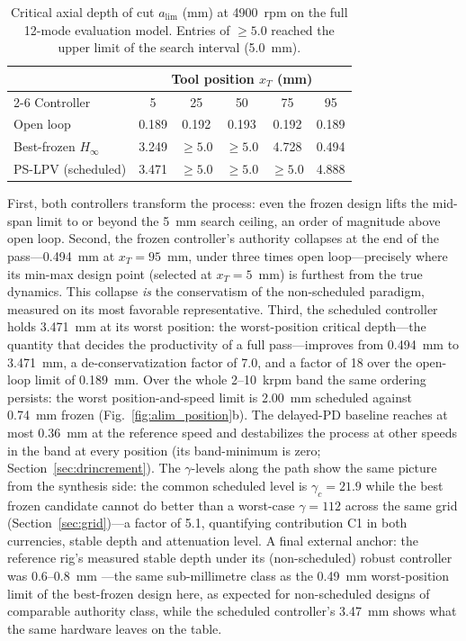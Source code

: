 \documentclass[preprint,12pt]{elsarticle}
\newcommand{\hinf}{H_\infty}
\begin{document}
\begin{table}[t]
\centering
\caption{Critical axial depth of cut $a_{\lim}$ (mm) at 4900~rpm on the
full 12-mode evaluation model. Entries of $\ge 5.0$ reached the upper
limit of the search interval (5.0~mm).}
\label{tab:alim}
\begin{tabular}{lccccc}
\toprule
& \multicolumn{5}{c}{Tool position $x_T$ (mm)} \\
\cmidrule(lr){2-6}
Controller & 5 & 25 & 50 & 75 & 95 \\
\midrule
Open loop              & 0.189 & 0.192 & 0.193 & 0.192 & 0.189 \\
Best-frozen $\hinf$    & 3.249 & $\ge 5.0$ & $\ge 5.0$ & 4.728 & 0.494 \\
PS-LPV (scheduled)     & 3.471 & $\ge 5.0$ & $\ge 5.0$ & $\ge 5.0$ & 4.888 \\
\bottomrule
\end{tabular}
\end{table}

First, both controllers transform the process: even the frozen design
lifts the mid-span limit to or beyond the 5~mm search ceiling, an order
of magnitude above open loop. Second, the frozen controller's authority
collapses at the end of the pass---0.494~mm at $x_T = 95$~mm, under
three times open loop---precisely where its min-max design point
(selected at $x_T = 5$~mm) is furthest from the true dynamics. This
collapse \emph{is} the conservatism of the non-scheduled paradigm,
measured on its most favorable representative. Third, the scheduled
controller holds 3.471~mm at its worst position: the worst-position
critical depth---the quantity that decides the productivity of a full
pass---improves from 0.494~mm to 3.471~mm, a de-conservatization factor
of 7.0, and a factor of 18 over the open-loop limit of 0.189~mm. Over
the whole 2--10~krpm band the same ordering persists: the worst
position-and-speed limit is 2.00~mm scheduled against 0.74~mm frozen
(Fig.~\ref{fig:alim_position}b). The delayed-PD baseline reaches at most
0.36~mm at the reference speed and destabilizes the process at
other speeds in the band at every position (its band-minimum is zero;
Section~\ref{sec:drincrement}). The $\gamma$-levels along the path show
the same picture from the synthesis side: the common scheduled level is
$\gamma_c = 21.9$ while the best frozen candidate cannot do better than
a worst-case $\gamma = 112$ across the same grid
(Section~\ref{sec:grid})---a factor of 5.1, quantifying contribution C1
in both currencies, stable depth and attenuation level. A final
external anchor: the reference rig's measured stable depth under its
(non-scheduled) robust controller was 0.6--0.8~mm
\cite{du2024robust}---the same sub-millimetre class as the 0.49~mm
worst-position limit of the best-frozen design here, as expected for
non-scheduled designs of comparable authority class, while the scheduled
controller's 3.47~mm shows what the same hardware leaves on the table.
\end{document}

